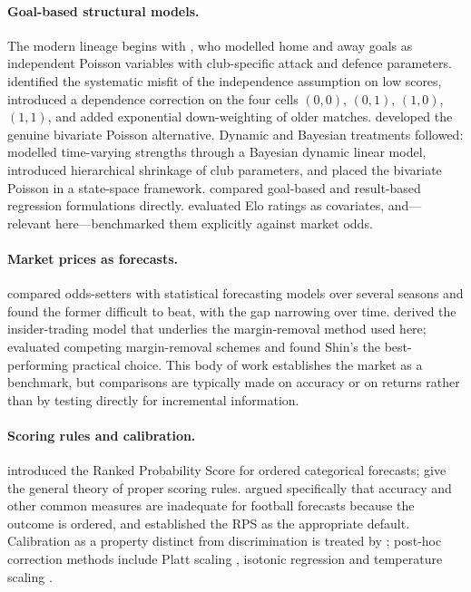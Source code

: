 \documentclass[11pt]{article}
\begin{document}
\paragraph{Goal-based structural models.} The modern lineage begins with
\citet{maher1982}, who modelled home and away goals as independent Poisson
variables with club-specific attack and defence parameters.
\citet{dixoncoles1997} identified the systematic misfit of the independence
assumption on low scores, introduced a dependence correction on the four cells
$(0,0)$, $(0,1)$, $(1,0)$, $(1,1)$, and added exponential down-weighting of
older matches. \citet{karlis2003} developed the genuine bivariate Poisson
alternative. Dynamic and Bayesian treatments followed:
\citet{rue2000} modelled time-varying strengths through a Bayesian dynamic
linear model, \citet{baio2010} introduced hierarchical shrinkage of club
parameters, and \citet{koopman2015} placed the bivariate Poisson in a
state-space framework. \citet{goddard2005} compared goal-based and
result-based regression formulations directly. \citet{hvattum2010} evaluated
Elo ratings as covariates, and---relevant here---benchmarked them explicitly
against market odds.

\paragraph{Market prices as forecasts.} \citet{forrest2005} compared
odds-setters with statistical forecasting models over several seasons and found
the former difficult to beat, with the gap narrowing over time.
\citet{shin1992,shin1993} derived the insider-trading model that underlies the
margin-removal method used here; \citet{strumbelj2014} evaluated competing
margin-removal schemes and found Shin's the best-performing practical choice.
This body of work establishes the market as a benchmark, but comparisons are
typically made on accuracy or on returns rather than by testing directly for
incremental information.

\paragraph{Scoring rules and calibration.} \citet{epstein1969} introduced the
Ranked Probability Score for ordered categorical forecasts;
\citet{gneiting2007} give the general theory of proper scoring rules.
\citet{constantinou2012} argued specifically that accuracy and other common
measures are inadequate for football forecasts because the outcome is ordered,
and established the RPS as the appropriate default. Calibration as a property
distinct from discrimination is treated by \citet{niculescu2005}; post-hoc
correction methods include Platt scaling \citep{platt1999}, isotonic regression
\citep{zadrozny2002} and temperature scaling \citep{guo2017}.
\end{document}
